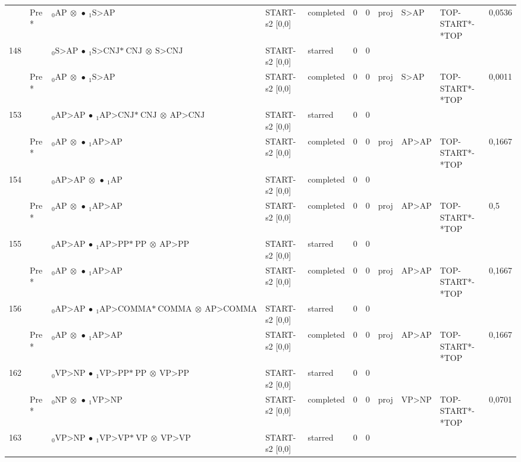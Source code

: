 \documentclass[10pt]{article}
\begin{document}
\begin{longtable}[htbp]{lllllllllll}
 & Pre *& $ {}_0 \textrm{AP} \  \otimes \  \bullet \ {}_{1} \textrm{S>AP} $ & START-s2 [0,0] & completed & 0 & 0 & proj & S>AP & TOP-START*-*TOP & 0,0536 \\ 
148 & & $ {}_0 \textrm{S>AP} \  \bullet \ {}_{1} \textrm{S>CNJ*} \ \textrm{CNJ} \  \otimes \ \textrm{S>CNJ} $ & START-s2 [0,0] & starred & 0 & 0 & & & & \\ 
 & Pre *& $ {}_0 \textrm{AP} \  \otimes \  \bullet \ {}_{1} \textrm{S>AP} $ & START-s2 [0,0] & completed & 0 & 0 & proj & S>AP & TOP-START*-*TOP & 0,0011 \\ 
153 & & $ {}_0 \textrm{AP>AP} \  \bullet \ {}_{1} \textrm{AP>CNJ*} \ \textrm{CNJ} \  \otimes \ \textrm{AP>CNJ} $ & START-s2 [0,0] & starred & 0 & 0 & & & & \\ 
 & Pre *& $ {}_0 \textrm{AP} \  \otimes \  \bullet \ {}_{1} \textrm{AP>AP} $ & START-s2 [0,0] & completed & 0 & 0 & proj & AP>AP & TOP-START*-*TOP & 0,1667 \\ 
154 & & $ {}_0 \textrm{AP>AP} \  \otimes \  \bullet \ {}_{1} \textrm{AP} $ & START-s2 [0,0] & completed & 0 & 0 & & & & \\ 
 & Pre *& $ {}_0 \textrm{AP} \  \otimes \  \bullet \ {}_{1} \textrm{AP>AP} $ & START-s2 [0,0] & completed & 0 & 0 & proj & AP>AP & TOP-START*-*TOP & 0,5 \\ 
155 & & $ {}_0 \textrm{AP>AP} \  \bullet \ {}_{1} \textrm{AP>PP*} \ \textrm{PP} \  \otimes \ \textrm{AP>PP} $ & START-s2 [0,0] & starred & 0 & 0 & & & & \\ 
 & Pre *& $ {}_0 \textrm{AP} \  \otimes \  \bullet \ {}_{1} \textrm{AP>AP} $ & START-s2 [0,0] & completed & 0 & 0 & proj & AP>AP & TOP-START*-*TOP & 0,1667 \\ 
156 & & $ {}_0 \textrm{AP>AP} \  \bullet \ {}_{1} \textrm{AP>COMMA*} \ \textrm{COMMA} \  \otimes \ \textrm{AP>COMMA} $ & START-s2 [0,0] & starred & 0 & 0 & & & & \\ 
 & Pre *& $ {}_0 \textrm{AP} \  \otimes \  \bullet \ {}_{1} \textrm{AP>AP} $ & START-s2 [0,0] & completed & 0 & 0 & proj & AP>AP & TOP-START*-*TOP & 0,1667 \\ 
162 & & $ {}_0 \textrm{VP>NP} \  \bullet \ {}_{1} \textrm{VP>PP*} \ \textrm{PP} \  \otimes \ \textrm{VP>PP} $ & START-s2 [0,0] & starred & 0 & 0 & & & & \\ 
 & Pre *& $ {}_0 \textrm{NP} \  \otimes \  \bullet \ {}_{1} \textrm{VP>NP} $ & START-s2 [0,0] & completed & 0 & 0 & proj & VP>NP & TOP-START*-*TOP & 0,0701 \\ 
163 & & $ {}_0 \textrm{VP>NP} \  \bullet \ {}_{1} \textrm{VP>VP*} \ \textrm{VP} \  \otimes \ \textrm{VP>VP} $ & START-s2 [0,0] & starred & 0 & 0 & & & & \\ 

\end{longtable}
\end{document}

